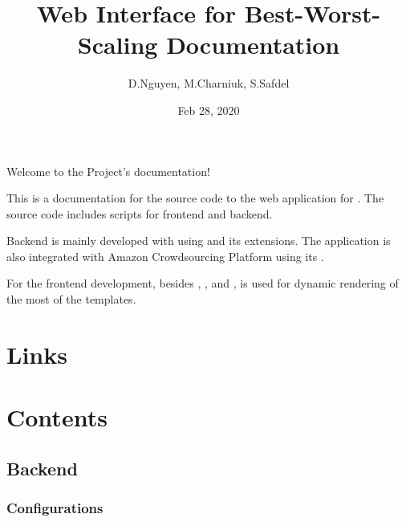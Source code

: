 \documentclass[a4paper,12pt,english]{sphinxmanual}
\title{Web Interface for Best-Worst-Scaling Documentation}
\date{Feb 28, 2020}
\author{D.Nguyen, M.Charniuk, S.Safdel}
\begin{document}
\pagestyle{empty}
\sphinxmaketitle
\pagestyle{plain}
\sphinxtableofcontents
\pagestyle{normal}
\label{\detokenize{index::doc}}


Welcome to the Project’s documentation!

This is a documentation for the source code to the web application for . The source code includes scripts for frontend and backend.

Backend is mainly developed with  using  and its extensions. The application is also integrated with Amazon Crowdsourcing Platform using its .

For the frontend development, besides , ,  and ,  is used for dynamic rendering of the most of the templates.


\chapter{Links}
\label{\detokenize{index:links}}


\chapter{Contents}
\label{\detokenize{index:contents}}

\section{Backend}
\label{\detokenize{index:backend}}

\subsection{Configurations}
\label{\detokenize{config:module-config}}\label{\detokenize{config:configurations}}\label{\detokenize{config::doc}}
 
\end{document}
